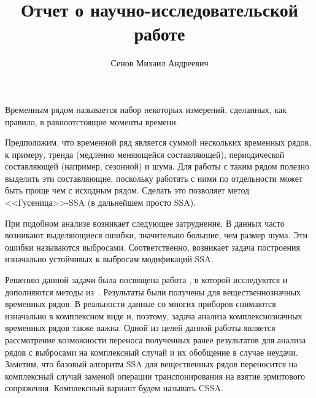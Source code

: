 \documentclass[specialist,
               substylefile = spbu.rtx,
               subf,href,colorlinks=true, 12pt]{disser}
\begin{document}

\title{Отчет о научно-исследовательской работе}


\author{Сенов Михаил Андреевич}


\date{\number\year}

\maketitle

\tableofcontents

\intro
Временным рядом называется набор некоторых измерений, сделанных, как правило, в равноотстоящие моменты времени.

Предположим, что временной ряд является суммой нескольких временных рядов, к примеру, тренда (медленно меняющейся составляющей), периодической составляющей (например, сезонной) и шума. Для работы с таким рядом полезно выделить эти составляющие, поскольку работать с ними по отдельности может быть проще чем с исходным рядом. Сделать это позволяет метод <<Гусеница>>-SSA (в дальнейшем просто SSA).

При подобном анализе возникает следующее затруднение. В данных часто возникают выделяющиеся ошибки, значительно большие, чем размер шума. Эти ошибки называются выбросами. Соответственно, возникает задача построения изначально устойчивых к выбросам модификаций SSA.

Решению данной задачи была посвящена работа \cite{Tretyakova20}, в которой исследуются и дополняются методы из~\cite{Trickett.etal2012,Kalantari.etal2016}. Результаты были получены для вещественнозначных временных рядов. В реальности данные со многих приборов снимаются изначально в комплексном виде и, поэтому, задача анализа комплекснозначных временных рядов также важна. Одной из целей данной работы является рассмотрение возможности переноса полученных ранее результатов для анализа рядов с выбросами на комплексный случай и их обобщение в случае неудачи. Заметим, что базовый алгоритм SSA для вещественных рядов переносится на комплексный случай заменой операции транспонирования на взятие эрмитового сопряжения. Комплексный вариант будем называть CSSA.
\end{document}
